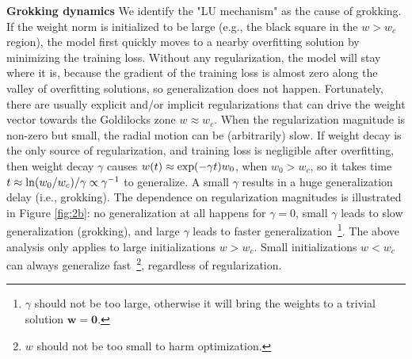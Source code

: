 \documentclass{article} %
\newcommand{\mat}[1]{\mathbf{#1}}
\begin{document}
{\bf Grokking dynamics}  We identify the "LU mechanism" as the cause of grokking. If the weight norm is initialized to be large (e.g., the black square in the $w > w_c$ region), the model first quickly moves to a nearby overfitting solution by minimizing the training loss. Without any regularization, the model will stay where it is, because the gradient of the training loss is almost zero along the valley of overfitting solutions, so generalization does not happen. Fortunately, there are usually explicit and/or implicit regularizations that can drive the weight vector towards the Goldilocks zone $w\approx w_c$. When the regularization magnitude is non-zero but small, the radial motion can be (arbitrarily) slow. If weight decay is the only source of regularization, and training loss is negligible after overfitting, then weight decay $\gamma$ causes $w(t)\approx {\rm exp}(-\gamma t)w_0$, when $w_0>w_c$, so it takes time $t\approx {\rm ln} (w_0/w_c)/\gamma\propto \gamma^{-1}$ to generalize. A small $\gamma$ results in a huge generalization delay (i.e., grokking). The dependence on regularization magnitudes is illustrated in Figure \ref{fig:2b}: no generalization at all happens for $\gamma=0$, small $\gamma$ leads to slow generalization (grokking), and large $\gamma$ leads to faster generalization~\footnote{$\gamma$ should not be too large, otherwise it will bring the weights to a trivial solution $\mat{w}=\mat{0}$. }. The above analysis only applies to large initializations $w > w_c$. Small initializations $w < w_c$ can always generalize fast~\footnote{$w$ should not be too small to harm optimization.}, regardless of regularization. %
\end{document}
